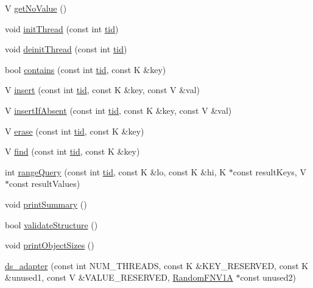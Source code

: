 \begin{DoxyCompactItemize}
V \hyperlink{classds__adapter_a9e1e4aec136b351d1a6820d70484a6c5}{get\+No\+Value} ()
\item 
void \hyperlink{classds__adapter_a3733f6a6b57312b1b5e4fb5181d82a0b}{init\+Thread} (const int \hyperlink{microbench_2main_8cpp_a9ca9869868fe7e7a38a921cc7de4103f}{tid})
\item 
void \hyperlink{classds__adapter_a173ca48b19fc1dc346159ea582c690cd}{deinit\+Thread} (const int \hyperlink{microbench_2main_8cpp_a9ca9869868fe7e7a38a921cc7de4103f}{tid})
\item 
bool \hyperlink{classds__adapter_aecf1899dbe9fae93c72ee2b5549cf6eb}{contains} (const int \hyperlink{microbench_2main_8cpp_a9ca9869868fe7e7a38a921cc7de4103f}{tid}, const K \&key)
\item 
V \hyperlink{classds__adapter_a6c0fc676d77e30e14946baf325174739}{insert} (const int \hyperlink{microbench_2main_8cpp_a9ca9869868fe7e7a38a921cc7de4103f}{tid}, const K \&key, const V \&val)
\item 
V \hyperlink{classds__adapter_ae9cb29ad0c0338c0e1d12ef97e008135}{insert\+If\+Absent} (const int \hyperlink{microbench_2main_8cpp_a9ca9869868fe7e7a38a921cc7de4103f}{tid}, const K \&key, const V \&val)
\item 
V \hyperlink{classds__adapter_a1bf459e8449df93cc738a644aeffdcfb}{erase} (const int \hyperlink{microbench_2main_8cpp_a9ca9869868fe7e7a38a921cc7de4103f}{tid}, const K \&key)
\item 
V \hyperlink{classds__adapter_a0109b0d011810f687c9e9273eb1d1bc8}{find} (const int \hyperlink{microbench_2main_8cpp_a9ca9869868fe7e7a38a921cc7de4103f}{tid}, const K \&key)
\item 
int \hyperlink{classds__adapter_a23a9c8db5425e98a93d647df1c6c23dd}{range\+Query} (const int \hyperlink{microbench_2main_8cpp_a9ca9869868fe7e7a38a921cc7de4103f}{tid}, const K \&lo, const K \&hi, K $\ast$const result\+Keys, V $\ast$const result\+Values)
\item 
void \hyperlink{classds__adapter_aac97293215557665d2ef1e1a0d06fcfd}{print\+Summary} ()
\item 
bool \hyperlink{classds__adapter_ae50fe8a8683c0278cdd4c45e1405860d}{validate\+Structure} ()
\item 
void \hyperlink{classds__adapter_a33b13b7059a8c0345fb59a324dc3a691}{print\+Object\+Sizes} ()
\item 
\hyperlink{classds__adapter_a8bd2274b39a6716d649cde5a8f313b40}{ds\+\_\+adapter} (const int N\+U\+M\+\_\+\+T\+H\+R\+E\+A\+DS, const K \&K\+E\+Y\+\_\+\+R\+E\+S\+E\+R\+V\+ED, const K \&unused1, const V \&V\+A\+L\+U\+E\+\_\+\+R\+E\+S\+E\+R\+V\+ED, \hyperlink{classRandomFNV1A}{Random\+F\+N\+V1A} $\ast$const unused2)

\end{DoxyCompactItemize}
